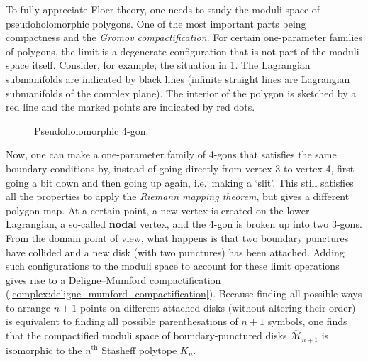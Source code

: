     \begin{property}
        To fully appreciate Floer theory, one needs to study the moduli space of pseudoholomorphic polygons. One of the most important parts being compactness and the \textit{Gromov compactification}. For certain one-parameter families of polygons, the limit is a degenerate configuration that is not part of the moduli space itself. Consider, for example, the situation in \cref{fig:floer_breaking}. The Lagrangian submanifolds are indicated by black lines (infinite straight lines are Lagrangian submanifolds of the complex plane). The interior of the polygon is sketched by a red line and the marked points are indicated by red dots.

        \begin{figure}[ht!]
            \centering
            \caption{Pseudoholomorphic 4-gon.}
            \label{fig:floer_breaking}
        \end{figure}
        Now, one can make a one-parameter family of 4-gons that satisfies the same boundary conditions by, instead of going directly from vertex 3 to vertex 4, first going a bit down and then going up again, i.e.~making a `slit'. This still satisfies all the properties to apply the \textit{Riemann mapping theorem}, but gives a different polygon map. At a certain point, a new vertex is created on the lower Lagrangian, a so-called \textbf{nodal} vertex, and the 4-gon is broken up into two 3-gons. From the domain point of view, what happens is that two boundary punctures have collided and a new disk (with two punctures) has been attached. Adding such configurations to the moduli space to account for these limit operations gives rise to a Deligne--Mumford compactification (\cref{complex:deligne_mumford_compactification}). Because finding all possible ways to arrange $n+1$ points on different attached disks (without altering their order) is equivalent to finding all possible parenthesations of $n+1$ symbols, one finds that the compactified moduli space of boundary-punctured disks $\overline{\mathcal{M}}_{n+1}$ is isomorphic to the $n^{\text{th}}$ Stasheff polytope $K_n$.


\end{property}
